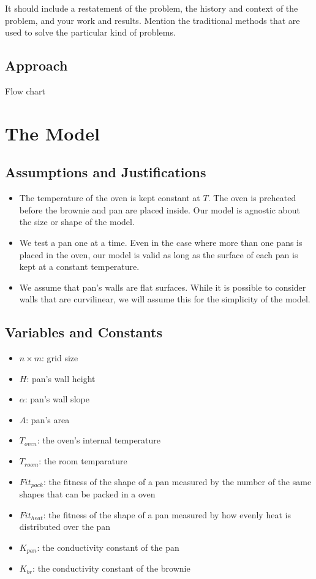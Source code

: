 \documentclass[12pt]{reedmcm}
\begin{document}
It should include a restatement of the problem, the history and context of the problem, and your work and results.
Mention the traditional methods that are used to solve the particular kind of problems.

\subsection{Approach}
Flow chart

\section{The Model}
\subsection{Assumptions and Justifications}
\begin{itemize}
  \item The temperature of the oven is kept constant at $T$.
   The oven is preheated before the brownie and pan are placed inside.
   Our model is agnostic about the size or shape of the model.

  \item We test a pan one at a time. 
    Even in the case where more than one pans is placed in the oven, our model is valid as long as the surface of each pan is kept at a constant temperature.

  \item We assume that pan's walls are flat surfaces. While it is possible to consider walls that are curvilinear, we will assume this for the simplicity of the model.
\end{itemize}

\subsection{Variables and Constants}
\begin{itemize}
  \item $n\times m$: grid size
  \item $H$: pan's wall height
  \item $\alpha$: pan's wall slope
  \item $A$: pan's area
  \item $T_{oven}$: the oven's internal temperature
  \item $T_{room}$: the room temparature
  \item $Fit_{pack}$: the fitness of the shape of a pan measured by the number of the same shapes that can be packed in a oven
  \item $Fit_{heat}$: the fitness of the shape of a pan measured by how evenly heat is distributed over the pan
  \item $K_{pan}$: the conductivity constant of the pan
  \item $K_{br}$: the conductivity constant of the brownie
\end{itemize}
\end{document}
